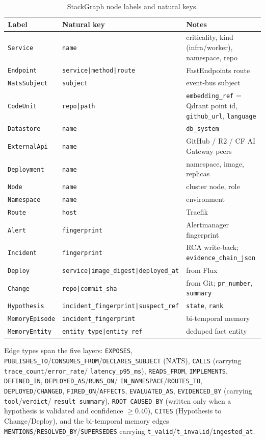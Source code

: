 \documentclass[11pt]{article}
\begin{document}
\begin{table}[h]
\centering
\small
\begin{tabular}{lll}
\toprule
\textbf{Label} & \textbf{Natural key} & \textbf{Notes} \\
\midrule
\texttt{Service} & \texttt{name} & criticality, kind (infra/worker), namespace, repo \\
\texttt{Endpoint} & \texttt{service|method|route} & FastEndpoints route \\
\texttt{NatsSubject} & \texttt{subject} & event-bus subject \\
\texttt{CodeUnit} & \texttt{repo|path} & \texttt{embedding\_ref} = Qdrant point id, \texttt{github\_url}, \texttt{language} \\
\texttt{Datastore} & \texttt{name} & \texttt{db\_system} \\
\texttt{ExternalApi} & \texttt{name} & GitHub / R2 / CF AI Gateway peers \\
\texttt{Deployment} & \texttt{name} & namespace, image, replicas \\
\texttt{Node} & \texttt{name} & cluster node, role \\
\texttt{Namespace} & \texttt{name} & environment \\
\texttt{Route} & \texttt{host} & Traefik \\
\texttt{Alert} & \texttt{fingerprint} & Alertmanager fingerprint \\
\texttt{Incident} & \texttt{fingerprint} & RCA write-back; \texttt{evidence\_chain\_json} \\
\texttt{Deploy} & \texttt{service|image\_digest|deployed\_at} & from Flux \\
\texttt{Change} & \texttt{repo|commit\_sha} & from Git; \texttt{pr\_number}, \texttt{summary} \\
\texttt{Hypothesis} & \texttt{incident\_fingerprint|suspect\_ref} & \texttt{state}, \texttt{rank} \\
\texttt{MemoryEpisode} & \texttt{incident\_fingerprint} & bi-temporal memory \\
\texttt{MemoryEntity} & \texttt{entity\_type|entity\_ref} & deduped fact entity \\
\bottomrule
\end{tabular}
\caption{StackGraph node labels and natural keys.}
\end{table}

Edge types span the five layers: \texttt{EXPOSES},
\texttt{PUBLISHES\_TO}/\texttt{CONSUMES\_FROM}/\texttt{DECLARES\_SUBJECT} (NATS),
\texttt{CALLS} (carrying \texttt{trace\_count}/\texttt{error\_rate}/%
\texttt{latency\_p95\_ms}), \texttt{READS\_FROM}, \texttt{IMPLEMENTS},
\texttt{DEFINED\_IN}, \texttt{DEPLOYED\_AS}/\texttt{RUNS\_ON}/%
\texttt{IN\_NAMESPACE}/\texttt{ROUTES\_TO}, \texttt{DEPLOYED}/\texttt{CHANGED},
\texttt{FIRED\_ON}/\texttt{AFFECTS}, \texttt{EVALUATED\_AS},
\texttt{EVIDENCED\_BY} (carrying \texttt{tool}/\texttt{verdict}/%
\texttt{result\_summary}), \texttt{ROOT\_CAUSED\_BY} (written only when a
hypothesis is validated and confidence $\geq 0.40$), \texttt{CITES} (Hypothesis
to Change/Deploy), and the bi-temporal memory edges
\texttt{MENTIONS}/\texttt{RESOLVED\_BY}/\texttt{SUPERSEDES} carrying
\texttt{t\_valid}/\texttt{t\_invalid}/\texttt{ingested\_at}.
\end{document}
